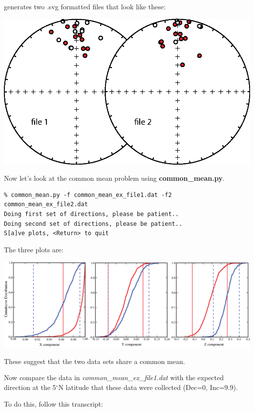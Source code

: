 \documentclass[11pt]{book}
\begin{document}
{{{{{\noindent generates two .svg formatted files that look like these:

{%
\hskip 1in %
  \includegraphics[width=15 cm]{EPSfiles/common-mean-eq.eps}}
  
Now let's look at the common mean problem using {\bf common\_mean.py}. 

\begin{verbatim}
% common_mean.py -f common_mean_ex_file1.dat -f2 common_mean_ex_file2.dat
Doing first set of directions, please be patient..
Doing second set of directions, please be patient..
S[a]ve plots, <Return> to quit
\end{verbatim}

\noindent The three plots are:

{ %
  \includegraphics[width=20 cm]{EPSfiles/common-mean.eps}}

These suggest that  the two data sets share a common mean.  

Now compare the data in  {\it common\_mean\_ex\_file1.dat }  with the expected direction at the 5$^{\circ}$N latitude that these data were collected (Dec=0, Inc=9.9).   

To do this,  follow this transcript:

}}}}}
\end{document}
